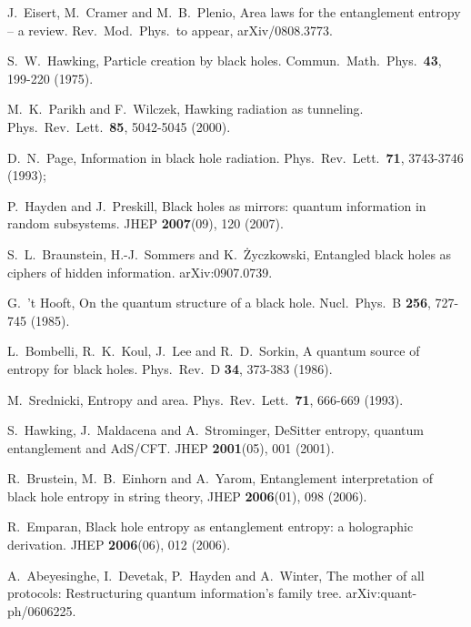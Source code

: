 \documentclass[12pt,aps,prl]{revtex4}
\begin{document}
\begin{thebibliography}{99}

 J.\ Eisert, M.\ Cramer and M.\ B.\ Plenio,
Area laws for the entanglement entropy -- a review.
Rev.\ Mod.\ Phys.\ to appear, arXiv/0808.3773.

 S.\ W.\ Hawking,
Particle creation by black holes.
Commun.\ Math.\ Phys.\ {\bf 43}, 199-220 (1975).

 M.\ K.\ Parikh and F.\ Wilczek,
Hawking radiation as tunneling.
Phys.\ Rev.\ Lett.\ {\bf 85}, 5042-5045 (2000).

 D.\ N.\ Page,
Information in black hole radiation.
Phys.\ Rev.\ Lett.\ {\bf 71}, 3743-3746 (1993);

 P.\ Hayden and J.\ Preskill,
Black holes as mirrors: quantum information in random subsystems.
JHEP {\bf 2007}(09), 120 (2007).

 S.\ L.\ Braunstein, H.-J.\ Sommers and K.\ \.{Z}yczkowski,
Entangled black holes as ciphers of hidden information.
arXiv:0907.0739.

 G.\ 't Hooft,
On the quantum structure of a black hole.
Nucl.\ Phys.\ B {\bf 256}, 727-745 (1985).

 L.\ Bombelli, R.\ K.\ Koul, J.\ Lee and R.\ D.\ Sorkin,
A quantum source of entropy for black holes.
Phys.\ Rev.\ D {\bf 34}, 373-383 (1986).

 M.\ Srednicki,
Entropy and area.
Phys.\ Rev.\ Lett.\ {\bf 71}, 666-669 (1993).

 S.\ Hawking, J.\ Maldacena and A.\ Strominger,
DeSitter entropy, quantum entanglement and AdS/CFT.
JHEP {\bf 2001}(05), 001 (2001).

 R.\ Brustein, M.\ B.\ Einhorn and A.\ Yarom,
Entanglement interpretation of black hole entropy in string theory,
JHEP {\bf 2006}(01), 098 (2006).

 R.\ Emparan,
Black hole entropy as entanglement entropy: a holographic derivation.
JHEP {\bf 2006}(06), 012 (2006).

 A.\ Abeyesinghe, I.\ Devetak, P.\ Hayden and A.\ Winter,
The mother of all protocols: Restructuring quantum information's family
tree.
arXiv:quant-ph/0606225.

\end{thebibliography}
\end{document}
